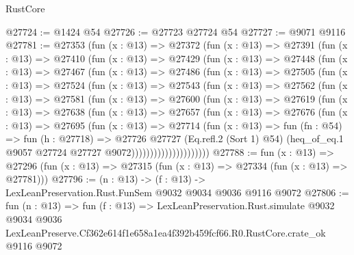 \begin{lexlean}{RustCore}
\begin{coremodule}
@27724 := @1424 @54
@27726 := @27723 @27724 @54
@27727 := @9071 @9116
@27781 := @27353
    (fun (x : @13) =>
    @27372
      (fun (x : @13) =>
      @27391
        (fun (x : @13) =>
        @27410
          (fun (x : @13) =>
          @27429
            (fun (x : @13) =>
            @27448
              (fun (x : @13) =>
              @27467
                (fun (x : @13) =>
                @27486
                  (fun (x : @13) =>
                  @27505
                    (fun (x : @13) =>
                    @27524
                      (fun (x : @13) =>
                      @27543
                        (fun (x : @13) =>
                        @27562
                          (fun (x : @13) =>
                          @27581
                            (fun (x : @13) =>
                            @27600
                              (fun (x : @13) =>
                              @27619
                                (fun (x : @13) =>
                                @27638
                                  (fun (x : @13) =>
                                  @27657
                                    (fun (x : @13) =>
                                    @27676
                                      (fun (x : @13) =>
                                      @27695
                                        (fun (x : @13) =>
                                        @27714
                                          (fun (x : @13) =>
                                          fun (fn : @54) =>
                                          fun (h : @27718) =>
                                          @27726
                                            @27727
                                            (Eq.refl.{2} (Sort 1) @54)
                                            (heq_of_eq.{1}
                                              @9057
                                              @27724
                                              @27727
                                              @9072)))))))))))))))))))))
@27788 := fun (x : @13) =>
  @27296 (fun (x : @13) => @27315 (fun (x : @13) => @27334 (fun (x : @13) => @27781)))
@27796 := (n : @13) -> (f : @13) -> LexLeanPreservation.Rust.FunSem @9032 @9034 @9036 @9116 @9072
@27806 := fun (n : @13) =>
  fun (f : @13) =>
  LexLeanPreservation.Rust.simulate
    @9032
    @9034
    @9036
    LexLeanPreserve.Cf362e614f1e658a1ea4f392b459fcf66.R0.RustCore.crate_ok
    @9116
    @9072
\end{coremodule}
\end{lexlean}
